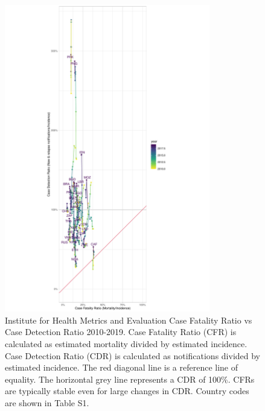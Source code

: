 \documentclass[12pt]{article}
\begin{document}
\begin{figure}
  \centering
  \includegraphics[width=0.8\textwidth]{../plots/aF8.pdf}
  \caption[Case Fatality Ratio vs Case Detection Ratio]{Institute for Health Metrics
    and Evaluation Case Fatality Ratio vs
    Case Detection Ratio 2010-2019. Case Fatality Ratio (CFR) is calculated as estimated
    mortality divided by estimated incidence.
    Case Detection Ratio (CDR) is calculated as notifications divided by
    estimated incidence. The red diagonal line is a reference line of equality.
    The horizontal grey line represents a CDR of 100\%. CFRs are typically
    stable even for large changes in CDR. Country codes are shown in Table S1.}
\end{figure}

\FloatBarrier
\end{document}
